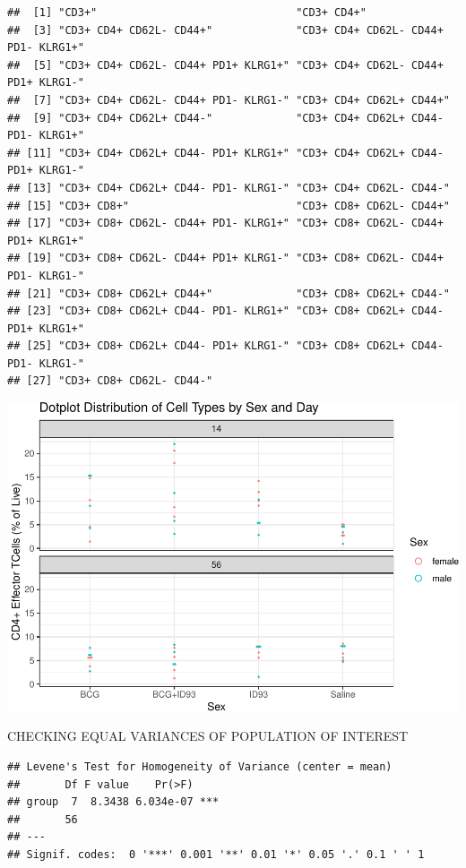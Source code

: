 \documentclass[
]{book}
\begin{document}
\begin{verbatim}
##  [1] "CD3+"                               "CD3+ CD4+"                         
##  [3] "CD3+ CD4+ CD62L- CD44+"             "CD3+ CD4+ CD62L- CD44+ PD1- KLRG1+"
##  [5] "CD3+ CD4+ CD62L- CD44+ PD1+ KLRG1+" "CD3+ CD4+ CD62L- CD44+ PD1+ KLRG1-"
##  [7] "CD3+ CD4+ CD62L- CD44+ PD1- KLRG1-" "CD3+ CD4+ CD62L+ CD44+"            
##  [9] "CD3+ CD4+ CD62L+ CD44-"             "CD3+ CD4+ CD62L+ CD44- PD1- KLRG1+"
## [11] "CD3+ CD4+ CD62L+ CD44- PD1+ KLRG1+" "CD3+ CD4+ CD62L+ CD44- PD1+ KLRG1-"
## [13] "CD3+ CD4+ CD62L+ CD44- PD1- KLRG1-" "CD3+ CD4+ CD62L- CD44-"            
## [15] "CD3+ CD8+"                          "CD3+ CD8+ CD62L- CD44+"            
## [17] "CD3+ CD8+ CD62L- CD44+ PD1- KLRG1+" "CD3+ CD8+ CD62L- CD44+ PD1+ KLRG1+"
## [19] "CD3+ CD8+ CD62L- CD44+ PD1+ KLRG1-" "CD3+ CD8+ CD62L- CD44+ PD1- KLRG1-"
## [21] "CD3+ CD8+ CD62L+ CD44+"             "CD3+ CD8+ CD62L+ CD44-"            
## [23] "CD3+ CD8+ CD62L+ CD44- PD1- KLRG1+" "CD3+ CD8+ CD62L+ CD44- PD1+ KLRG1+"
## [25] "CD3+ CD8+ CD62L+ CD44- PD1+ KLRG1-" "CD3+ CD8+ CD62L+ CD44- PD1- KLRG1-"
## [27] "CD3+ CD8+ CD62L- CD44-"
\end{verbatim}

\includegraphics{csu-impactb_files/figure-latex/unnamed-chunk-71-1.pdf}

CHECKING EQUAL VARIANCES OF POPULATION OF INTEREST

\begin{verbatim}
## Levene's Test for Homogeneity of Variance (center = mean)
##       Df F value    Pr(>F)    
## group  7  8.3438 6.034e-07 ***
##       56                      
## ---
## Signif. codes:  0 '***' 0.001 '**' 0.01 '*' 0.05 '.' 0.1 ' ' 1
\end{verbatim}
\end{document}
